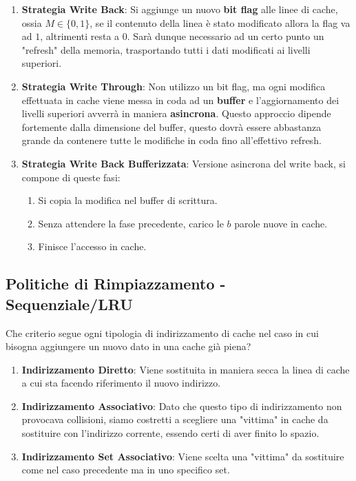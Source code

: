 \documentclass{article}
\begin{document}
\begin{enumerate}
    \item \textbf{Strategia Write Back}: Si aggiunge un nuovo \textbf{bit flag} alle linee di cache, ossia $M \in \{ 0,1 \}$, se il contenuto della linea è stato modificato allora la flag va ad $1$, altrimenti resta a $0$. Sarà dunque necessario ad un certo punto un "refresh" della memoria, trasportando tutti i dati modificati ai livelli superiori.
    \item \textbf{Strategia Write Through}: Non utilizzo un bit flag, ma ogni modifica effettuata in cache viene messa in coda ad un \textbf{buffer} e l'aggiornamento dei livelli superiori avverrà in maniera \textbf{asincrona}. Questo approccio dipende fortemente dalla dimensione del buffer, questo dovrà essere abbastanza grande da contenere tutte le modifiche in coda fino all'effettivo refresh.
    \newpage
    \item \textbf{Strategia Write Back Bufferizzata}: Versione asincrona del write back, si compone di queste fasi:
    \begin{enumerate}
        \item Si copia la modifica nel buffer di scrittura.
        \item Senza attendere la fase precedente, carico le $b$ parole nuove in cache.
        \item Finisce l'accesso in cache.
    \end{enumerate}
\end{enumerate}

\subsection{Politiche di Rimpiazzamento - Sequenziale/LRU}

Che criterio segue ogni tipologia di indirizzamento di cache nel caso in cui bisogna aggiungere un nuovo dato in una cache già piena?

\begin{enumerate}
    \item \textbf{Indirizzamento Diretto}: Viene sostituita in maniera secca la linea di cache a cui sta facendo riferimento il nuovo indirizzo.
    \item \textbf{Indirizzamento Associativo}: Dato che questo tipo di indirizzamento non provocava collisioni, siamo costretti a scegliere una "vittima" in cache da sostituire con l'indirizzo corrente, essendo certi di aver finito lo spazio.
    \item \textbf{Indirizzamento Set Associativo}: Viene scelta una "vittima" da sostituire come nel caso precedente ma in uno specifico set.
\end{enumerate}
\end{document}
